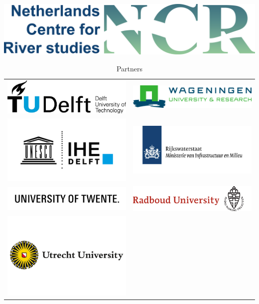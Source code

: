 \begin{table}
        \includegraphics[width=\textwidth]{figures/ncrlogo_plustext.png}
    \caption*{\huge  Partners}
    
    \begin{tabular}{cc}
        \includegraphics[width = 2.5in]{figures/tudlogo.jpg} &
        \includegraphics[width = 2.5in]{figures/wageningenlogo.png} \\
        \includegraphics[width = 2.5in]{figures/ihedelftlogo.png} &
        \includegraphics[width = 2.5in]{figures/rijkswaterstaatlogo.jpg}\\
        \includegraphics[width = 2.5in]{figures/Twentelogo.jpg} &
        \includegraphics[width = 2.5in]{figures/radboudlogo.png} \\
        \includegraphics[width = 2.5in]{figures/utrechtlogo.png} &

\end{tabular}
\end{table}
